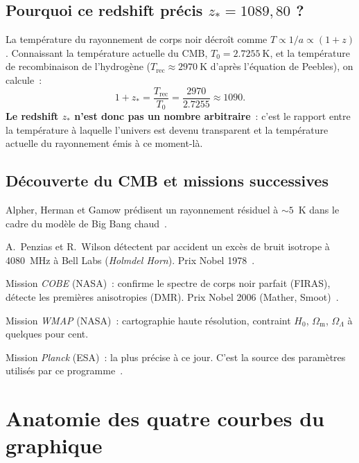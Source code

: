 \documentclass[11pt,a4paper,openany]{report}
\newcommand{\Hzero}{H_{0}}
\newcommand{\Om}{\Omega_{\mathrm{m}}}
\newcommand{\OL}{\Omega_{\Lambda}}
\begin{document}
\section{Pourquoi ce redshift précis $z_{*} = 1089{,}80$ ?}

La température du rayonnement de corps noir décroît comme $T \propto 1/a
\propto (1+z)$. Connaissant la température actuelle du CMB, $T_{0} =
\SI{2.7255}{\kelvin}$, et la température de recombinaison de l'hydrogène
($T_{\text{rec}} \approx \SI{2970}{\kelvin}$ d'après l'équation de Peebles),
on calcule~:
\[
1 + z_{*} = \frac{T_{\text{rec}}}{T_{0}}
          = \frac{\num{2970}}{\num{2.7255}} \approx 1090.
\]
\textbf{Le redshift $z_{*}$ n'est donc pas un nombre arbitraire}~: c'est le
rapport entre la température à laquelle l'univers est devenu transparent et la
température actuelle du rayonnement émis à ce moment-là.

\section{Découverte du CMB et missions successives}

\begin{description}[leftmargin=2.2cm]
\item[1948] Alpher, Herman et Gamow prédisent un rayonnement résiduel
à $\sim 5$~K dans le cadre du modèle de Big Bang chaud~\cite{Alpher1948}.
\item[1965] A.~Penzias et R.~Wilson détectent par accident un excès de bruit
isotrope à 4080~MHz à Bell Labs (\emph{Holmdel Horn}). Prix Nobel 1978~\cite{Penzias1965}.
\item[1989-1993] Mission \emph{COBE} (NASA)~: confirme le spectre de corps noir
parfait (FIRAS), détecte les premières anisotropies (DMR). Prix Nobel
2006 (Mather, Smoot)~\cite{Mather1994,Smoot1992}.
\item[2001-2010] Mission \emph{WMAP} (NASA)~: cartographie haute résolution,
contraint $\Hzero$, $\Om$, $\OL$ à quelques pour cent.
\item[2009-2013] Mission \emph{Planck} (ESA)~: la plus précise à ce jour. C'est
la source des paramètres utilisés par ce programme~\cite{Planck2018}.
\end{description}

\chapter{Anatomie des quatre courbes du graphique}
\label{chap:courbes}
\end{document}
